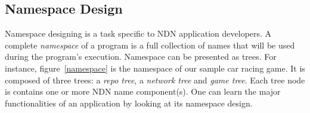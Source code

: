\documentclass{sigchi}
\begin{document}
\subsection{Namespace Design}

Namespace designing is a task specific to NDN application developers. A complete \emph{namespace} of a program is a full collection of names that will be used during the program's execution. Namespace can be presented as trees. For instance, figure~\ref{namespace} is the namespace of our sample car racing game. It is composed of three trees: a \emph{repo tree}, a \emph{network tree} and \emph{game tree}. Each tree node is contains one or more NDN name component(s). One can learn the major functionalities of an application by looking at its namespace design.
\end{document}
